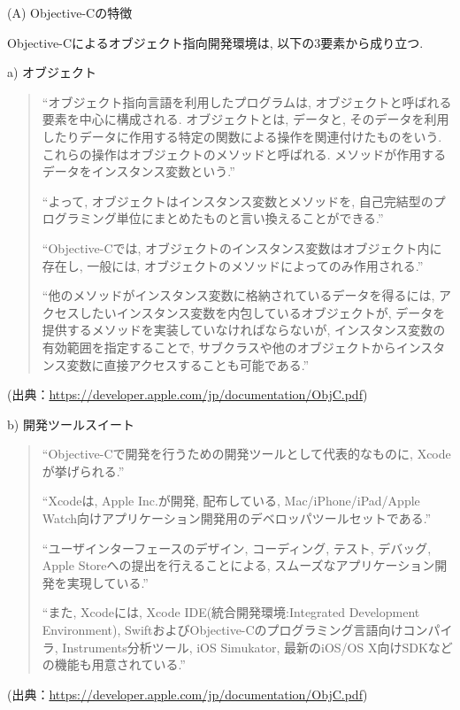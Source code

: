 \begin{description}
\item (A) Objective-Cの特徴

Objective-Cによるオブジェクト指向開発環境は, 以下の3要素から成り立つ.

\begin{description}
\item a) オブジェクト

\begin{quotation}
\begin{screen}
“オブジェクト指向言語を利用したプログラムは, オブジェクトと呼ばれる要素を中心に構成される.
オブジェクトとは, データと, そのデータを利用したりデータに作用する特定の関数による操作を関連付けたものをいう.
これらの操作はオブジェクトのメソッドと呼ばれる.
メソッドが作用するデータをインスタンス変数という.”

“よって, オブジェクトはインスタンス変数とメソッドを, 自己完結型のプログラミング単位にまとめたものと言い換えることができる.”

“Objective-Cでは, オブジェクトのインスタンス変数はオブジェクト内に存在し, 一般には, オブジェクトのメソッドによってのみ作用される.”

“他のメソッドがインスタンス変数に格納されているデータを得るには, アクセスしたいインスタンス変数を内包しているオブジェクトが, データを提供するメソッドを実装していなければならないが, インスタンス変数の有効範囲を指定することで, サブクラスや他のオブジェクトからインスタンス変数に直接アクセスすることも可能である.”
\end{screen}
\end{quotation}
\begin{flushright}
(出典：\url{https://developer.apple.com/jp/documentation/ObjC.pdf})
\end{flushright}

\item b) 開発ツールスイート

\begin{quotation}
\begin{screen}
“Objective-Cで開発を行うための開発ツールとして代表的なものに, Xcodeが挙げられる.”

“Xcodeは, Apple Inc.が開発, 配布している, Mac/iPhone/iPad/Apple Watch向けアプリケーション開発用のデベロッパツールセットである.”

“ユーザインターフェースのデザイン, コーディング, テスト, デバッグ, Apple Storeへの提出を行えることによる, スムーズなアプリケーション開発を実現している.”

“また, Xcodeには, Xcode IDE(統合開発環境:Integrated Development Environment), SwiftおよびObjective-Cのプログラミング言語向けコンパイラ, Instruments分析ツール, iOS Simukator, 最新のiOS/OS X向けSDKなどの機能も用意されている.”
\end{screen}
\end{quotation}
\begin{flushright}
(出典：\url{https://developer.apple.com/jp/documentation/ObjC.pdf})
\end{flushright}


\end{description}
\end{description}
